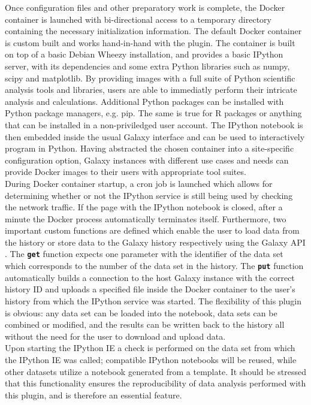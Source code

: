 \documentclass{bioinfo}
\begin{document}
\begin{methods}
Once configuration files and other preparatory work is complete, the Docker container is launched with bi-directional
access to a temporary directory containing the necessary initialization information. The default Docker container is
custom built and works hand-in-hand with the plugin. The container is built on top of a basic Debian Wheezy installation,
and provides a basic IPython server, with its dependencies and some extra Python libraries such as numpy, scipy and matplotlib.
By providing images with a full suite of Python scientific analysis tools and libraries, users are able 
to immediatly perform their intricate analysis and calculations. Additional Python packages can be installed with Python
package managers, e.g. pip. The same is true for R packages or anything that can be installed in a non-priviledged user account. 
The IPython notebook is then embedded inside the usual Galaxy interface and can be used to interactively program in Python.
Having abstracted the chosen container into a site-specific configuration option, Galaxy instances with different use cases
and needs can provide Docker images to their users with appropriate tool suites.\\
During Docker container startup, a cron job is launched which allows for determining whether or not the IPython service
is still being used by checking the network traffic. If the page with the IPython notebook is closed, after a minute the
Docker process automatically terminates itself. Furthermore, two important custom functions are defined which enable the
user to load data from the history or store data to the Galaxy history respectively using the Galaxy API \citep{Sloggett2013}.
The \textbf{\texttt{get}} function expects one parameter with the identifier of the data set which corresponds to the number
of the data set in the history. The \textbf{\texttt{put}} function automatically builds a connection to the host
Galaxy instance with the correct history ID and uploads a specified file inside the Docker container to the user's
history from which the IPython service was started. The flexibility of this plugin is obvious: any data set can be
loaded into the notebook, data sets can be combined or modified, and the results can be written back to the history
all without the need for the user to download and upload data. \\
Upon starting the IPython IE a check is performed on the data set from which the IPython IE was called; compatible IPython
notebooks will be reused, while other datasets utilize a notebook generated from a template. It should be stressed that
this functionality ensures the reproducibility of data analysis performed with this plugin, and is therefore an essential
feature.



\end{methods}
\end{document}
